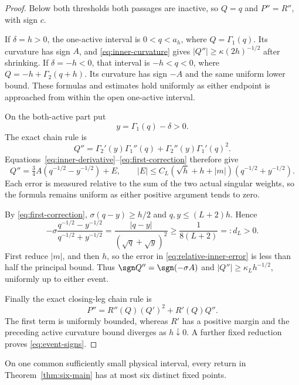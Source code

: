 \begin{proof}
Below both thresholds both passages are inactive, so \(Q=q\) and
\(P''=R''\), with sign \(c\).

If \(\delta=h>0\), the one-active interval is \(0<q<a_h\), where
\(Q=\Gamma_1(q)\). Its curvature has sign \(A\), and
\eqref{eq:inner-curvature} gives
\(|Q''|\ge\kappa(2h)^{-1/2}\) after shrinking.
If \(\delta=-h<0\), that interval is \(-h<q<0\), where
\(Q=-h+\Gamma_2(q+h)\). Its curvature has sign \(-A\) and the same
uniform lower bound. These formulas and estimates hold uniformly as either endpoint is approached from within the open one-active interval.

On the both-active part put
\[
 y=\Gamma_1(q)-\delta>0.
\]
The exact chain rule is
\[
 Q''=\Gamma_2'(y)\Gamma_1''(q)
          +\Gamma_2''(y)\Gamma_1'(q)^2.
\]
Equations~\eqref{eq:inner-derivative}--\eqref{eq:first-correction}
therefore give
\begin{equation}\label{eq:relative-inner-error}
 Q''=\tfrac34 A(q^{-1/2}-y^{-1/2})+E,\qquad
 |E|\le C_L(\sqrt h+h+|m|)
                 (q^{-1/2}+y^{-1/2}).
\end{equation}
Each error is measured relative to the sum of the two actual singular
weights, so the formula remains uniform as either positive argument tends
to zero.

By \eqref{eq:first-correction},
\(\sigma(q-y)\ge h/2\) and \(q,y\le(L+2)h\). Hence
\[
 -\sigma\frac{q^{-1/2}-y^{-1/2}}{q^{-1/2}+y^{-1/2}}
 =\frac{|q-y|}{(\sqrt q+\sqrt y)^2}
 \ge\frac1{8(L+2)}=:d_L>0.
\]
First reduce \(|m|\), and then \(h\), so the error in
\eqref{eq:relative-inner-error} is less than half the principal bound.
Thus \(\sgn Q''=\sgn(-\sigma A)\) and
\(|Q''|\ge\kappa_Lh^{-1/2}\), uniformly up to either event.

Finally the exact closing-leg chain rule is
\[
 P''=R''(Q)(Q')^2+R'(Q)Q''.
\]
The first term is uniformly bounded, whereas \(R'\) has a positive
margin and the preceding active curvature bound diverges as
\(h\downarrow0\). A further fixed reduction proves
\eqref{eq:event-signs}.
\end{proof}

\begin{proposition}\label{prop:common-count}
On one common sufficiently small physical interval, every return in
Theorem~\ref{thm:six-main} has at most six distinct fixed points.
\end{proposition}

